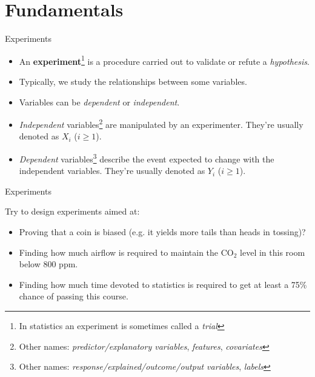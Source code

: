 \section{Fundamentals}

\begin{frame}{Experiments}

    \begin{itemize}
        \item An \textbf{experiment}\footnote{In statistics an experiment is sometimes called a \emph{trial}} is a procedure carried out to validate or refute a \emph{hypothesis}.
        \item Typically, we study the relationships between some variables.
        \item Variables can be \emph{dependent} or \emph{independent}.
        \item \emph{Independent} variables\footnote{Other names: \emph{predictor/explanatory variables}, \emph{features}, \emph{covariates}} are manipulated by an experimenter. They're usually denoted as $X_i$ ($i \geq 1$).
        \item \emph{Dependent} variables\footnote{Other names: \emph{response/explained/outcome/output variables}, \emph{labels}} describe the event expected to change with the independent variables. They're usually denoted as $Y_i$ ($i \geq 1$). 
    \end{itemize}

\end{frame}

\begin{frame}{Experiments}

\begin{example}
    \medskip
    Try to design experiments aimed at:
    
    \begin{itemize}
        \item Proving that a coin is biased (e.g. it yields more tails than heads in tossing)?
        \item Finding how much airflow is required to maintain the CO$_2$ level in this room below 800 ppm.
        \item Finding how much time devoted to statistics is required to get at least a 75\% chance of passing this course.
    \end{itemize}
    
\end{example}

\end{frame}


